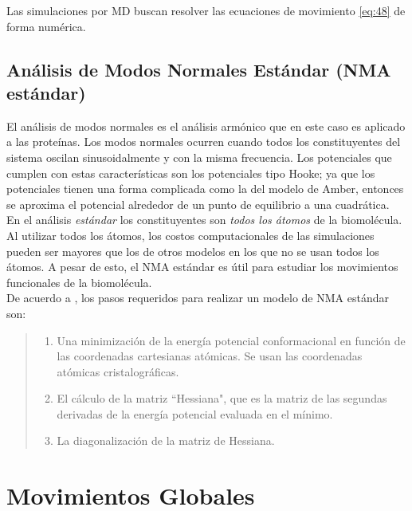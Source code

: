 Las simulaciones por MD buscan resolver las ecuaciones de movimiento \eqref{eq:48} de forma num\'{e}rica.\\
\subsection{An\'{a}lisis de Modos Normales Est\'{a}ndar (NMA est\'{a}ndar)}\label{NMAsta}

El an\'{a}lisis de modos normales es el an\'{a}lisis arm\'{o}nico que en este caso es aplicado a las prote\'{i}nas. Los modos normales ocurren cuando todos los constituyentes del sistema oscilan sinusoidalmente y con la misma frecuencia. Los potenciales que cumplen con estas caracter\'{i}sticas son los potenciales tipo Hooke; ya que los potenciales tienen una forma complicada como la del modelo de Amber, entonces se aproxima el potencial alrededor de un punto de equilibrio a una cuadr\'{a}tica.\\

En el an\'{a}lisis \textit{est\'{a}ndar} los constituyentes son \textit{todos los \'{a}tomos} de la biomol\'{e}cula. Al utilizar todos los \'{a}tomos, los costos computacionales de las simulaciones pueden ser mayores que los de otros modelos en los que no se usan todos los \'{a}tomos. A pesar de esto, el NMA est\'{a}ndar es \'{u}til para estudiar los movimientos funcionales de la biomol\'{e}cula.\\

De acuerdo a \cite{Hayward2008}, los pasos requeridos para realizar un modelo de NMA est\'{a}ndar son:
\begin{quote}
 \begin{enumerate}
  \item Una minimizaci\'{o}n de la energ\'{i}a potencial conformacional en funci\'{o}n de las coordenadas cartesianas at\'{o}micas. Se usan las coordenadas at\'{o}micas cristalogr\'{a}ficas.
  \item El c\'{a}lculo de la matriz ``Hessiana", que es la matriz de las segundas derivadas de la energ\'{i}a potencial evaluada en el m\'{i}nimo. 
  \item La diagonalizaci\'{o}n de la matriz de Hessiana.
 \end{enumerate}
\end{quote}


\section{Movimientos Globales}

